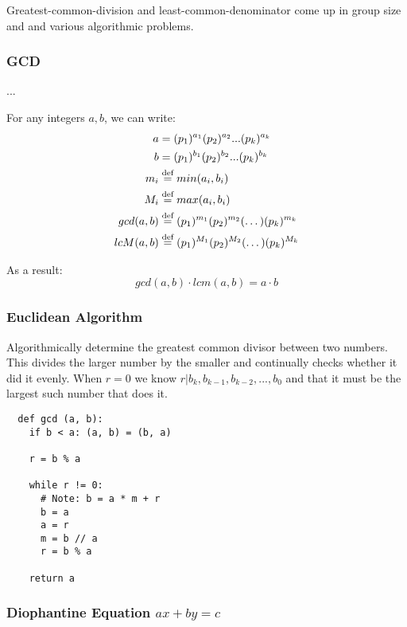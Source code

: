 \documentclass{article}
\begin{document}
Greatest-common-division and least-common-denominator come up in group size and
and various algorithmic problems.

\pagebreak
\subsubsection{GCD}

...

For any integers $a, b$, we can write:
  \begin{align*}
    a   & = (p_1)^{a_1} (p_2)^{a_2} ... (p_k)^{a_k}     \\
    b   & = (p_1)^{b_1} (p_2)^{b_2} ... (p_k)^{b_k}     \\
    m_i & \stackrel{\text{def}}{=} min(a_i, b_i)                          \\
    M_i & \stackrel{\text{def}}{=} max(a_i, b_i)                          \\
    gcd(a, b) & \stackrel{\text{def}}{=} (p_1)^{m_1} (p_2)^{m_2} (\dots) (p_k)^{m_k} \\
    lcM(a, b) & \stackrel{\text{def}}{=} (p_1)^{M_1} (p_2)^{M_2} (\dots) (p_k)^{M_k} \\
  \end{align*}

As a result:
  $$ gcd(a, b) \cdot lcm(a, b) = a \cdot b $$

\subsubsection{Euclidean Algorithm}

Algorithmically determine the greatest common divisor between two numbers. This
divides the larger number by the smaller and continually checks whether it did
it evenly. When $r = 0$ we know $ r | b_k, b_{k-1}, b_{k-2}, ..., b_0 $ and that
it must be the largest such number that does it.

\begin{verbatim}
  def gcd (a, b):
    if b < a: (a, b) = (b, a)

    r = b % a

    while r != 0:
      # Note: b = a * m + r
      b = a
      a = r
      m = b // a
      r = b % a

    return a
\end{verbatim}

\subsubsection{Diophantine Equation $ax +by = c$}
\end{document}
